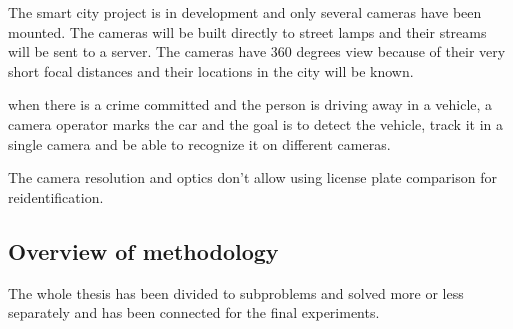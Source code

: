 \documentclass[a4paper,12pt,titlepage, twoside]{article}
\numberwithin{figure}{section}
\begin{document}
The smart city project is in development and only several cameras have been mounted. The cameras will be built directly to street lamps and their streams will be sent to a server. The cameras have 360 degrees view because of their very short focal distances and their locations in the city will be known.

when there is a crime committed and the person is driving away in a vehicle, a camera operator marks the car and the goal is to detect the vehicle, track it in a single camera and be able to recognize it on different cameras. 

The camera resolution and optics don't allow using license plate comparison for reidentification.

\subsection{Overview of methodology}

The whole thesis has been divided to subproblems and solved more or less separately and has been connected for the final experiments. 
\end{document}
